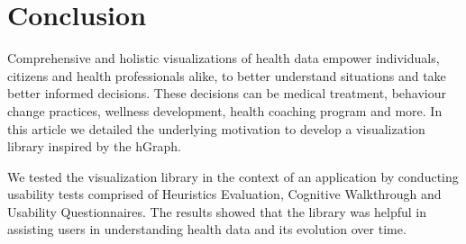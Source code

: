 \documentclass[twocolumn]{bmcart}%
\begin{document}
\section*{Conclusion}




Comprehensive and holistic visualizations of health data empower individuals, citizens and health professionals alike, to better understand situations and take better informed decisions. These decisions can be medical treatment, behaviour change practices, wellness development, health coaching program and more. In this article we detailed the underlying motivation to develop a visualization library inspired by the hGraph. 


We tested the visualization library in the context of an application by conducting usability tests comprised of Heuristics Evaluation, Cognitive Walkthrough and Usability Questionnaires. The results showed that the library was helpful in assisting users in understanding health data and its evolution over time.
\end{document}
